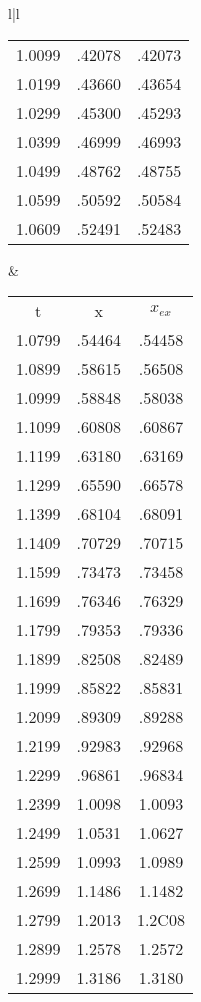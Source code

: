 \begin{figure}
\begin{tabular}{l|l}
\begin{tabular}{ccc}
            1.0099 & .42078 & .42073 \\
            1.0199 & .43660 & .43654 \\
            1.0299 & .45300 & .45293 \\
            1.0399 & .46999 & .46993 \\
            1.0499 & .48762 & .48755 \\
            1.0599 & .50592 & .50584 \\
            1.0609 & .52491 & .52483 \\
        \end{tabular}
        &
        \begin{tabular}{ccc}
            t &  x  & $x_{ex}$ \\
            1.0799 & .54464 & .54458 \\
            1.0899 & .58615 & .56508 \\
            1.0999 & .58848 & .58038 \\
            1.1099 & .60808 & .60867 \\
            1.1199 & .63180 & .63169 \\
            1.1299 & .65590 & .66578 \\
            1.1399 & .68104 & .68091 \\
            1.1409 & .70729 & .70715 \\
            1.1599 & .73473 & .73458 \\
            1.1699 & .76346 & .76329 \\
            1.1799 & .79353 & .79336 \\
            1.1899 & .82508 & .82489 \\
            1.1999 & .85822 & .85831 \\
            1.2099 & .89309 & .89288 \\
            1.2199 & .92983 & .92968 \\
            1.2299 & .96861 & .96834 \\
            1.2399 & 1.0098 & 1.0093 \\
            1.2499 & 1.0531 & 1.0627 \\
            1.2599 & 1.0993 & 1.0989 \\
            1.2699 & 1.1486 & 1.1482 \\
            1.2799 & 1.2013 & 1.2C08 \\
            1.2899 & 1.2578 & 1.2572 \\
            1.2999 & 1.3186 & 1.3180 \\

\end{tabular}
\end{tabular}
\end{figure}
